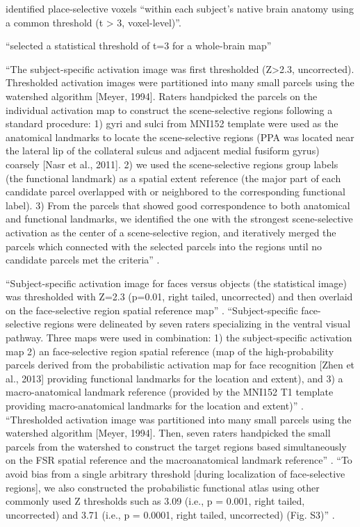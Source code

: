 %
\citet{weiner2018defining} identified place-selective voxels ``within each
subject's native brain anatomy using a common threshold (t > 3, voxel-level)''.

%
\citet{rosenke2021probabilistic} ``selected a statistical threshold of t=3 for a
whole-brain map''


%
``The subject-specific activation image was first thresholded (Z>2.3,
uncorrected).
%
Thresholded activation images were partitioned into many small parcels using the
watershed algorithm [Meyer, 1994].
%
Raters handpicked the parcels on the individual activation map to construct the
scene-selective regions following a standard procedure:
%
1) gyri and sulci from MNI152 template were used as the anatomical landmarks to
locate the scene-selective regions (PPA was located near the lateral lip of the
collateral sulcus and adjacent medial fusiform gyrus) coarsely [Nasr et al.,
2011].
%
2) we used the scene-selective regions group labels (the functional landmark) as
a spatial extent reference (the major part of each candidate parcel overlapped
with or neighbored to the corresponding functional label).
%
3) From the parcels that showed good correspondence to both anatomical and
functional landmarks, we identified the one with the strongest scene-selective
activation as the center of a scene-selective region, and iteratively merged the
parcels which connected with the selected parcels into the regions until no
candidate parcels met the criteria'' \citep{zhen2017quantifying}.

%
``Subject-specific activation image for faces versus objects (the statistical
image) was thresholded with Z=2.3 (p=0.01, right tailed,
uncorrected) and then overlaid on the face-selective region spatial reference
map'' \citep{zhen2015quantifying}.
%
``Subject-specific face-selective regions were delineated by seven raters
specializing in the ventral visual pathway.
%
Three maps were used in combination:
%
1) the subject-specific activation map
%
2) an face-selective region spatial reference (map of the high-probability
parcels derived from the probabilistic activation map for face recognition [Zhen
et al., 2013] providing functional landmarks for the location and extent), and
%
3) a macro-anatomical landmark reference (provided by the MNI152 T1 template
providing macro-anatomical landmarks for the location and extent)''
\citep{zhen2015quantifying}.
%
``Thresholded activation image was partitioned into many small parcels using the
watershed algorithm [Meyer, 1994].
%
Then, seven raters handpicked the small parcels from the watershed to construct
the target regions based simultaneously on the FSR spatial reference and the
macroanatomical landmark reference'' \citep{zhen2015quantifying}.
%
``To avoid bias from a single arbitrary threshold [during localization of
face-selective regions], we also constructed the probabilistic functional atlas
using other commonly used Z thresholds such as 3.09 (i.e., p = 0.001, right
tailed, uncorrected) and 3.71 (i.e., p = 0.0001, right tailed, uncorrected)
(Fig. S3)'' \citep{zhen2015quantifying}.



